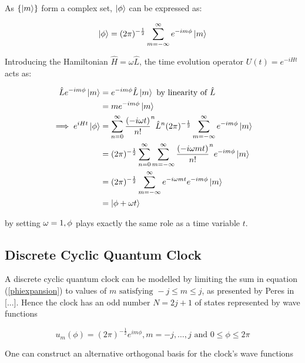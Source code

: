\documentclass{article}
\begin{document}
\noindent As $\{\ket{m}\}$ form a complex set, $\ket{\phi}$ can be expressed as:

\begin{equation}
	\ket{\phi} = (2\pi)^{-\frac{1}{2}}\sum_{m=-\infty}^{\infty}e^{-im\phi}\ket{m}
	\label{phiexpansion}
\end{equation}

\noindent Introducing the Hamiltonian $\hat{H}=\omega \hat{L}$, the time evolution operator $U(t) = e^{-iHt}$ acts as:

\begin{align}
\hat{L}e^{-im\phi}\ket{m} &= e^{-im\phi}\hat{L}\ket{m} \text{ by linearity of } \hat{L} \\
				  &= me^{-im\phi}\ket{m} \\
\implies e^{iHt}\ket{\phi} &= \sum_{n=0}^{\infty}\frac{(-i\omega t)}{n!}^n \hat{L}^n (2\pi)^{-\frac{1}{2}}\sum_{m=-\infty}^{\infty}e^{-im\phi}\ket{m} \\
			   &= (2\pi)^{-\frac{1}{2}}\sum_{n=0}^{\infty}\sum_{m=-\infty}^{\infty} \frac{(-i\omega mt)}{n!}^n e^{-im\phi} \ket{m} \\
				   &= (2\pi)^{-\frac{1}{2}}\sum_{m=-\infty}^{\infty}e^{-i\omega mt}e^{-im\phi}\ket{m} \\
				   &= \ket{\phi+\omega t}
\end{align}

\noindent by setting $\omega = 1, \space \phi$ plays exactly the same role as a time variable $t$.

\subsection{Discrete Cyclic Quantum Clock}
A discrete cyclic quantum clock can be modelled by limiting the sum in equation (\ref{phiexpansion}) to values of \linebreak $m \text{ satisfying } -j \leq m \leq j$, as presented by Peres in [...]. Hence the clock has an odd number $N = 2j+1$ of states represented by wave functions

\begin{equation}
	u_m(\phi) = (2\pi)^{-\frac{1}{2}}e^{im\phi}, m = -j,\dots, j \text{ and } 0 \leq \phi \leq 2\pi
\end{equation}

\noindent One can construct an alternative orthogonal basis for the clock's wave functions
\end{document}
